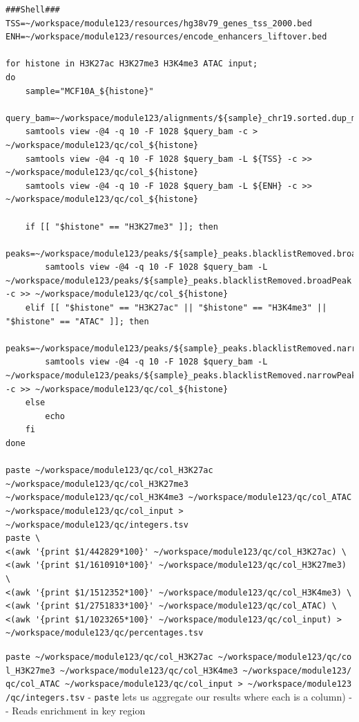 \documentclass[
]{book}
\begin{document}
\begin{verbatim}
###Shell###
TSS=~/workspace/module123/resources/hg38v79_genes_tss_2000.bed
ENH=~/workspace/module123/resources/encode_enhancers_liftover.bed

for histone in H3K27ac H3K27me3 H3K4me3 ATAC input;
do
    sample="MCF10A_${histone}"
    query_bam=~/workspace/module123/alignments/${sample}_chr19.sorted.dup_marked.bam
    samtools view -@4 -q 10 -F 1028 $query_bam -c > ~/workspace/module123/qc/col_${histone}
    samtools view -@4 -q 10 -F 1028 $query_bam -L ${TSS} -c >> ~/workspace/module123/qc/col_${histone}
    samtools view -@4 -q 10 -F 1028 $query_bam -L ${ENH} -c >> ~/workspace/module123/qc/col_${histone}

    if [[ "$histone" == "H3K27me3" ]]; then
        peaks=~/workspace/module123/peaks/${sample}_peaks.blacklistRemoved.broadPeak
        samtools view -@4 -q 10 -F 1028 $query_bam -L ~/workspace/module123/peaks/${sample}_peaks.blacklistRemoved.broadPeak -c >> ~/workspace/module123/qc/col_${histone}
    elif [[ "$histone" == "H3K27ac" || "$histone" == "H3K4me3" || "$histone" == "ATAC" ]]; then
        peaks=~/workspace/module123/peaks/${sample}_peaks.blacklistRemoved.narrowPeak
        samtools view -@4 -q 10 -F 1028 $query_bam -L ~/workspace/module123/peaks/${sample}_peaks.blacklistRemoved.narrowPeak -c >> ~/workspace/module123/qc/col_${histone}
    else 
        echo
    fi
done

paste ~/workspace/module123/qc/col_H3K27ac ~/workspace/module123/qc/col_H3K27me3 ~/workspace/module123/qc/col_H3K4me3 ~/workspace/module123/qc/col_ATAC ~/workspace/module123/qc/col_input > ~/workspace/module123/qc/integers.tsv
paste \
<(awk '{print $1/442829*100}' ~/workspace/module123/qc/col_H3K27ac) \
<(awk '{print $1/1610910*100}' ~/workspace/module123/qc/col_H3K27me3) \
<(awk '{print $1/1512352*100}' ~/workspace/module123/qc/col_H3K4me3) \
<(awk '{print $1/2751833*100}' ~/workspace/module123/qc/col_ATAC) \
<(awk '{print $1/1023265*100}' ~/workspace/module123/qc/col_input) > ~/workspace/module123/qc/percentages.tsv
\end{verbatim}

\texttt{paste\ \textasciitilde{}/workspace/module123/qc/col\_H3K27ac\ \textasciitilde{}/workspace/module123/qc/col\_H3K27me3\ \textasciitilde{}/workspace/module123/qc/col\_H3K4me3\ \textasciitilde{}/workspace/module123/qc/col\_ATAC\ \textasciitilde{}/workspace/module123/qc/col\_input\ \textgreater{}\ \textasciitilde{}/workspace/module123/qc/integers.tsv}
- \texttt{paste} lets us aggregate our results where each is a column)
-
- Reads enrichment in key region
\end{document}
